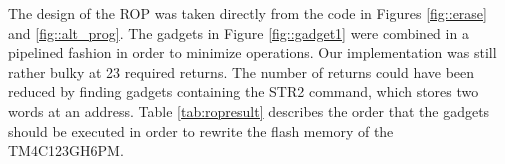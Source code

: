 The design of the ROP was taken directly from the code in Figures \ref{fig::erase} and \ref{fig::alt_prog}. The gadgets in Figure \ref{fig::gadget1} were combined in a pipelined fashion in order to minimize operations. Our implementation was still rather bulky at 23 required returns. The number of returns could have been reduced by finding gadgets containing the STR2 command, which stores two words at an address. Table \ref{tab:ropresult} describes the order that the gadgets should be executed in order to rewrite the flash memory of the TM4C123GH6PM.

